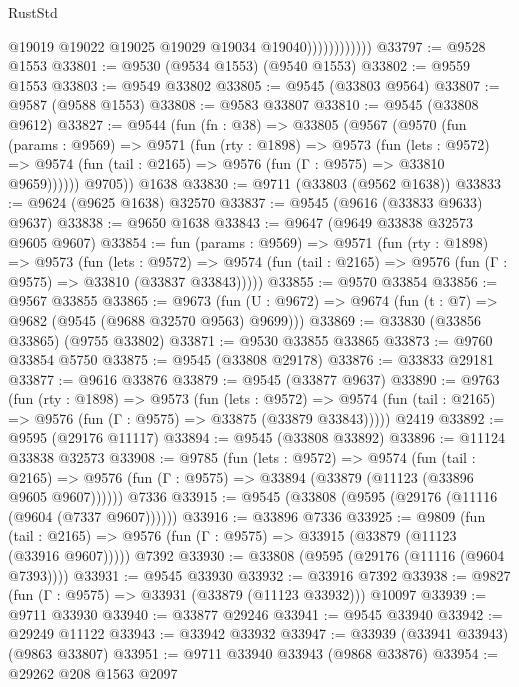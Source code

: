 \begin{lexlean}{RustStd}
\begin{coremodule}
                            @19019
                            @19022
                            @19025
                            @19029
                            @19034
                            @19040))))))))))))
@33797 := @9528 @1553
@33801 := @9530 (@9534 @1553) (@9540 @1553)
@33802 := @9559 @1553
@33803 := @9549 @33802
@33805 := @9545 (@33803 @9564)
@33807 := @9587 (@9588 @1553)
@33808 := @9583 @33807
@33810 := @9545 (@33808 @9612)
@33827 := @9544
    (fun (fn : @38) =>
    @33805
      (@9567
        (@9570
          (fun (params : @9569) =>
          @9571
            (fun (rty : @1898) =>
            @9573
              (fun (lets : @9572) =>
              @9574 (fun (tail : @2165) => @9576 (fun (Γ : @9575) => @33810 @9659))))))
        @9705))
    @1638
@33830 := @9711 (@33803 (@9562 @1638))
@33833 := @9624 (@9625 @1638) @32570
@33837 := @9545 (@9616 (@33833 @9633) @9637)
@33838 := @9650 @1638
@33843 := @9647 (@9649 @33838 @32573 @9605 @9607)
@33854 := fun (params : @9569) =>
  @9571
    (fun (rty : @1898) =>
    @9573
      (fun (lets : @9572) =>
      @9574 (fun (tail : @2165) => @9576 (fun (Γ : @9575) => @33810 (@33837 @33843)))))
@33855 := @9570 @33854
@33856 := @9567 @33855
@33865 := @9673
    (fun (U : @9672) => @9674 (fun (t : @7) => @9682 (@9545 (@9688 @32570 @9563) @9699)))
@33869 := @33830 (@33856 @33865) (@9755 @33802)
@33871 := @9530 @33855 @33865
@33873 := @9760 @33854 @5750
@33875 := @9545 (@33808 @29178)
@33876 := @33833 @29181
@33877 := @9616 @33876
@33879 := @9545 (@33877 @9637)
@33890 := @9763
    (fun (rty : @1898) =>
    @9573
      (fun (lets : @9572) =>
      @9574 (fun (tail : @2165) => @9576 (fun (Γ : @9575) => @33875 (@33879 @33843)))))
    @2419
@33892 := @9595 (@29176 @11117)
@33894 := @9545 (@33808 @33892)
@33896 := @11124 @33838 @32573
@33908 := @9785
    (fun (lets : @9572) =>
    @9574
      (fun (tail : @2165) =>
      @9576 (fun (Γ : @9575) => @33894 (@33879 (@11123 (@33896 @9605 @9607))))))
    @7336
@33915 := @9545 (@33808 (@9595 (@29176 (@11116 (@9604 (@7337 @9607))))))
@33916 := @33896 @7336
@33925 := @9809
    (fun (tail : @2165) => @9576 (fun (Γ : @9575) => @33915 (@33879 (@11123 (@33916 @9607)))))
    @7392
@33930 := @33808 (@9595 (@29176 (@11116 (@9604 @7393))))
@33931 := @9545 @33930
@33932 := @33916 @7392
@33938 := @9827 (fun (Γ : @9575) => @33931 (@33879 (@11123 @33932))) @10097
@33939 := @9711 @33930
@33940 := @33877 @29246
@33941 := @9545 @33940
@33942 := @29249 @11122
@33943 := @33942 @33932
@33947 := @33939 (@33941 @33943) (@9863 @33807)
@33951 := @9711 @33940 @33943 (@9868 @33876)
@33954 := @29262 @208 @1563 @2097

\end{coremodule}
\end{lexlean}
